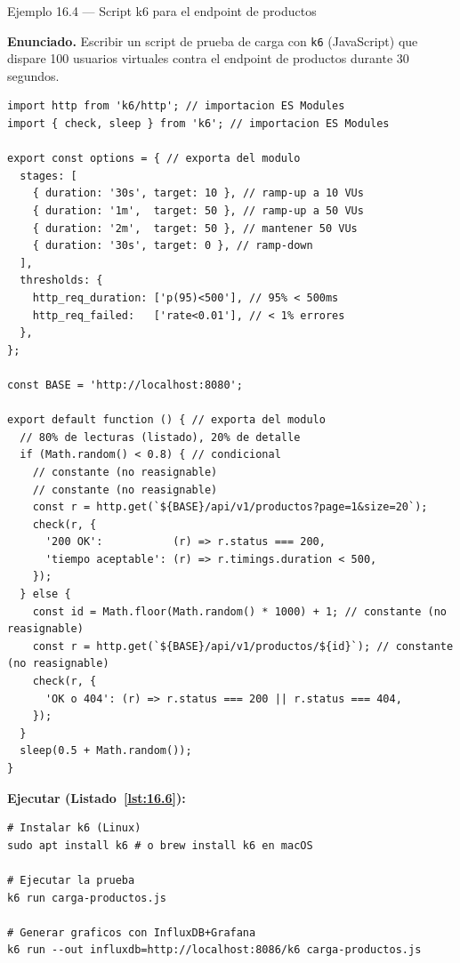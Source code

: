 \begin{cajaejemplo}{Ejemplo 16.4 --- Script k6 para el endpoint de productos}

\textbf{Enunciado.} Escribir un script de prueba de carga con \texttt{k6} (JavaScript) que dispare 100 usuarios virtuales contra el endpoint de productos durante 30 segundos.

\begin{lstlisting}[style=js,caption={carga-productos.js},label=lst:16.5]
import http from 'k6/http'; // importacion ES Modules
import { check, sleep } from 'k6'; // importacion ES Modules

export const options = { // exporta del modulo
  stages: [
    { duration: '30s', target: 10 }, // ramp-up a 10 VUs
    { duration: '1m',  target: 50 }, // ramp-up a 50 VUs
    { duration: '2m',  target: 50 }, // mantener 50 VUs
    { duration: '30s', target: 0 }, // ramp-down
  ],
  thresholds: {
    http_req_duration: ['p(95)<500'], // 95% < 500ms
    http_req_failed:   ['rate<0.01'], // < 1% errores
  },
};

const BASE = 'http://localhost:8080';

export default function () { // exporta del modulo
  // 80% de lecturas (listado), 20% de detalle
  if (Math.random() < 0.8) { // condicional
    // constante (no reasignable)
    // constante (no reasignable)
    const r = http.get(`${BASE}/api/v1/productos?page=1&size=20`);
    check(r, {
      '200 OK':           (r) => r.status === 200,
      'tiempo aceptable': (r) => r.timings.duration < 500,
    });
  } else {
    const id = Math.floor(Math.random() * 1000) + 1; // constante (no reasignable)
    const r = http.get(`${BASE}/api/v1/productos/${id}`); // constante (no reasignable)
    check(r, {
      'OK o 404': (r) => r.status === 200 || r.status === 404,
    });
  }
  sleep(0.5 + Math.random());
}
\end{lstlisting}

\textbf{Ejecutar (Listado~\ref{lst:16.6}):}
\begin{lstlisting}[style=shell,numbers=none,caption={Ejemplo de Shell},label=lst:16.6]
# Instalar k6 (Linux)
sudo apt install k6 # o brew install k6 en macOS

# Ejecutar la prueba
k6 run carga-productos.js

# Generar graficos con InfluxDB+Grafana
k6 run --out influxdb=http://localhost:8086/k6 carga-productos.js
\end{lstlisting}
\end{cajaejemplo}

